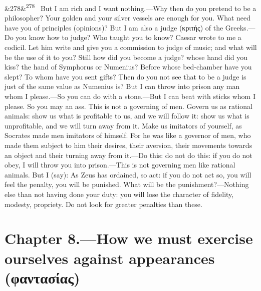 \documentclass[12pt]{article}
\newcommand{\para}[1][]{\par\noindent\ifx&#1&\else\textsuperscript{\footnotesize #1}~\fi}
\begin{document}
\para[278] But I am rich and I want nothing.—Why then do you pretend to be a philosopher? Your golden and your silver vessels are enough for you. What need have you of principles (opinions)? But I am also a judge (κριτής) of the Greeks.—Do you know how to judge? Who taught you to know? Caesar wrote to me a codicil. Let him write and give you a commission to judge of music; and what will be the use of it to you? Still how did you become a judge? whose hand did you kiss? the hand of Symphorus or Numenius? Before whose bed-chamber have you slept? To whom have you sent gifts? Then do you not see that to be a judge is just of the same value as Numenius is? But I can throw into prison any man whom I please.—So you can do with a stone.—But I can beat with sticks whom I please. So you may an ass. This is not a governing of men. Govern us as rational animals: show us what is profitable to us, and we will follow it: show us what is unprofitable, and we will turn away from it. Make us imitators of yourself, as Socrates made men imitators of himself. For he was like a governor of men, who made them subject to him their desires, their aversion, their movements towards an object and their turning away from it.—Do this: do not do this: if you do not obey, I will throw you into prison.—This is not governing men like rational animals. But I (say): As Zeus has ordained, so act: if you do not act so, you will feel the penalty, you will be punished. What will be the punishment?—Nothing else than not having done your duty: you will lose the character of fidelity, modesty, propriety. Do not look for greater penalties than these.

\section*{Chapter 8.---How we must exercise ourselves against appearances (φαντασίας)}
\end{document}
